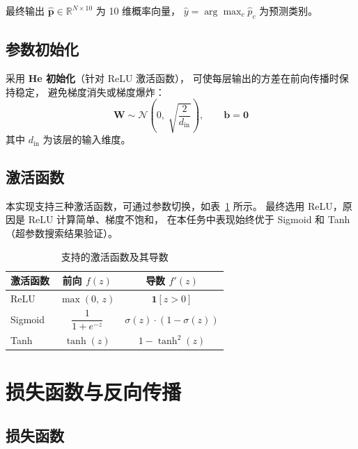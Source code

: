 \documentclass[12pt, a4paper]{article}
\begin{document}
最终输出 $\hat{\mathbf{p}} \in \mathbb{R}^{N\times10}$ 为 10 维概率向量，
$\hat{y} = \arg\max_c \hat{p}_c$ 为预测类别。

\subsection{参数初始化}

采用 \textbf{He 初始化}（针对 ReLU 激活函数），
可使每层输出的方差在前向传播时保持稳定，
避免梯度消失或梯度爆炸：
\begin{equation}
  \mathbf{W} \sim \mathcal{N}\!\left(0,\; \sqrt{\frac{2}{d_{\mathrm{in}}}}\right), \qquad
  \mathbf{b} = \mathbf{0}
\end{equation}
其中 $d_{\mathrm{in}}$ 为该层的输入维度。

\subsection{激活函数}

本实现支持三种激活函数，可通过参数切换，如表~\ref{tab:act} 所示。
最终选用 ReLU，原因是 ReLU 计算简单、梯度不饱和，
在本任务中表现始终优于 Sigmoid 和 Tanh（超参数搜索结果验证）。

\begin{table}[H]
  \centering
  \caption{支持的激活函数及其导数}
  \label{tab:act}
  \begin{tabular}{lcc}
    \toprule
    \textbf{激活函数} & \textbf{前向}  $f(z)$ & \textbf{导数} $f'(z)$ \\
    \midrule
    ReLU    & $\max(0,\,z)$                           & $\mathbf{1}[z>0]$                   \\
    Sigmoid & $\dfrac{1}{1+e^{-z}}$                   & $\sigma(z)\cdot(1-\sigma(z))$       \\
    Tanh    & $\tanh(z)$                              & $1 - \tanh^2(z)$                   \\
    \bottomrule
  \end{tabular}
\end{table}

\section{损失函数与反向传播}

\subsection{损失函数}
\end{document}
